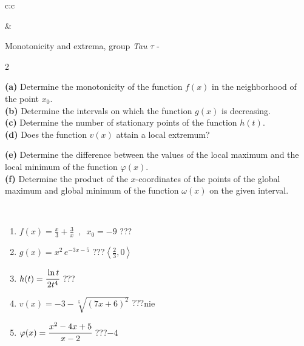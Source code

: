 \documentclass[10pt]{report}
\begin{document}
\begin{tabular}{c:c}
\begin{minipage}[c][104.5mm][t]{0.5\linewidth}
\end{minipage}
&
\begin{minipage}[c][104.5mm][t]{0.5\linewidth}
\begin{center}
\vspace{5mm}
{\huge Monotonicity and extrema, group \textit{Tau $\tau$} -}\\[5mm]
\begin{minipage}{0.95\linewidth}
\begin{center}
{\small \begin{multicols}{2} \raggedright
\textbf{(a)} Determine the monotonicity of the function \(f(x)\) in the neighborhood of the point \(x_0\). \\[1mm]
\textbf{(b)} Determine the intervals on which the function \(g(x)\) is decreasing. \\[1mm]
\textbf{(c)} Determine the number of stationary points of the function \(h(t)\). \\[1mm]
\textbf{(d)} Does the function \(v(x)\) attain a local extremum? \par \columnbreak
\textbf{(e)} Determine the difference between the values of the local maximum and the local minimum of the function \(\varphi(x)\). \\[1mm]
\textbf{(f)} Determine the product of the \(x\)-coordinates of the points of the global maximum and global minimum of the function \(\omega(x)\) on the given interval. \\[1mm]
\end{multicols}
}
\end{center}
\end{minipage}
\\[1mm]
\begin{minipage}{0.79\linewidth}
\begin{center}
\begin{varwidth}{\linewidth}
\setlength{\itemsep}{0pt}
\begin{enumerate}
\normalsize
\item $f(x)=\frac{x}{3}+\frac{3}{x} \enspace , \enspace x_0=-9$\quad \dotfill\; ???\;\dotfill \quad {}
\item $g(x)=x^2\, e^{-3x-5}$\quad \dotfill\; ???\;\dotfill \quad $\left\langle\frac{2}{3} , 0\right\rangle$
\item $h(t)=\cfrac{\ln t}{2t^4}$\quad \dotfill\; ???\;\dotfill {}
\item $v(x)=-3-\sqrt[5]{(7x+6)^2}$\quad \dotfill\; ???\;\dotfill \quad $\text{nie}$
\item $\varphi(x)=\cfrac{x^2-4x+5}{x-2}$\quad \dotfill\; ???\;\dotfill \quad $-4$

\end{enumerate}
\end{varwidth}
\end{center}
\end{minipage}
\end{center}
\end{minipage}
\end{tabular}
\end{document}
